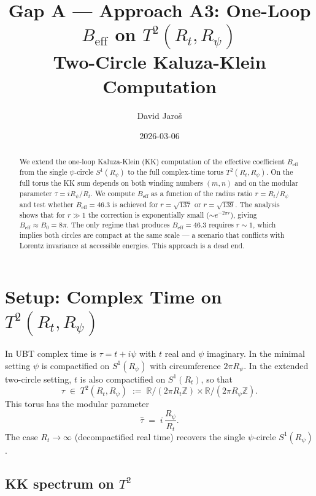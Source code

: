 \documentclass[12pt,a4paper]{article}
\title{\textbf{Gap A --- Approach A3: One-Loop $B_{\mathrm{eff}}$ on $T^2(R_t, R_\psi)$}\\
         \large Two-Circle Kaluza-Klein Computation}
\author{David Jaro\v{s}}
\date{2026-03-06}
\theoremstyle{definition}
\theoremstyle{remark}
\begin{document}
  \maketitle

  \begin{abstract}
  We extend the one-loop Kaluza-Klein (KK) computation of the effective
  coefficient $B_{\mathrm{eff}}$ from the single $\psi$-circle $S^1(R_\psi)$
  to the full complex-time torus $T^2(R_t, R_\psi)$.  On the full torus the
  KK sum depends on both winding numbers $(m, n)$ and on the modular parameter
  $\tau = i R_\psi / R_t$.  We compute $B_{\mathrm{eff}}$ as a function of the
  radius ratio $r = R_t/R_\psi$ and test whether $B_{\mathrm{eff}} = 46.3$ is
  achieved for $r = \sqrt{137}$ or $r = \sqrt{139}$.  The analysis shows
  that for $r \gg 1$ the correction is exponentially small
  ($\sim e^{-2\pi r}$), giving $B_{\mathrm{eff}} \approx B_0 = 8\pi$.
  The only regime that produces $B_{\mathrm{eff}} = 46.3$ requires $r \sim 1$,
  which implies both circles are compact at the same scale --- a scenario that
  conflicts with Lorentz invariance at accessible energies.  This approach is
  a dead end.
  \end{abstract}
\fi

\section{Setup: Complex Time on $T^2(R_t, R_\psi)$}
\label{sec:setup}

In UBT complex time is $\tau = t + i\psi$ with $t$ real and $\psi$
imaginary.  In the minimal setting $\psi$ is compactified on $S^1(R_\psi)$
with circumference $2\pi R_\psi$.  In the extended two-circle setting,
$t$ is also compactified on $S^1(R_t)$, so that
\begin{equation}
  \tau \;\in\; T^2(R_t, R_\psi)
  \;:=\; \mathbb{R}/(2\pi R_t\mathbb{Z}) \times \mathbb{R}/(2\pi R_\psi\mathbb{Z}).
  \label{eq:torus}
\end{equation}
This torus has the modular parameter
\begin{equation}
  \hat\tau \;=\; i\,\frac{R_\psi}{R_t}.
  \label{eq:modparam}
\end{equation}
The case $R_t \to \infty$ (decompactified real time) recovers the single
$\psi$-circle $S^1(R_\psi)$.

\subsection{KK spectrum on $T^2$}
\end{document}
